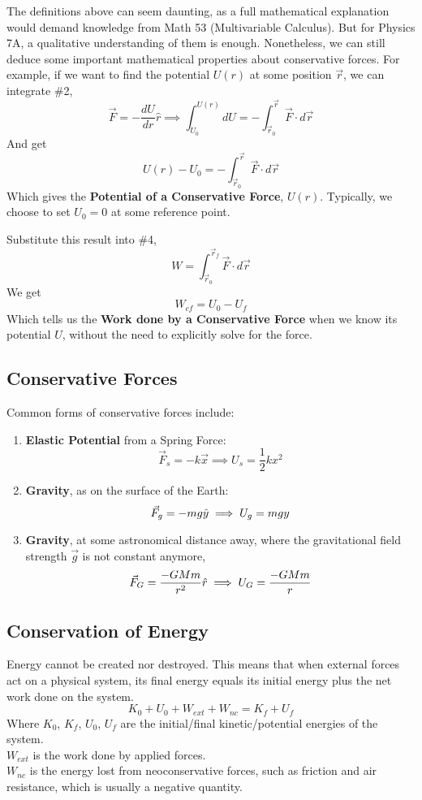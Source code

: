 \documentclass[11pt]{article}
\theoremstyle{gangnamstyle}{\newtheorem{definition}{Definition}[]}
\theoremstyle{gangnamstyle}{\newtheorem{example}{Example}[]}
\theoremstyle{gangnamstyle}{\newtheorem{problem}{Problem}[]}
\begin{document}
The definitions above can seem daunting, as a full mathematical explanation would demand knowledge from Math 53 (Multivariable Calculus). But for Physics 7A, a qualitative understanding of them is enough. Nonetheless, we can still deduce some important mathematical properties about conservative forces. For example, if we want to find the potential $U(r)$ at some position $\Vec{r}$, we can integrate \#2, 
\[ \Vec{F} = - \frac{dU}{dr} \hat{r} \implies \int_{U_0}^{U(r)} dU = - \int_{\Vec{r}_0}^{\Vec{r}} \Vec{F} \cdot d\Vec{r} \]
And get
\[ U(r) - U_0 = - \int_{\Vec{r}_0}^{\Vec{r}} \Vec{F} \cdot d\Vec{r} \]
Which gives the \textbf{Potential of a Conservative Force}, $U(r)$. Typically, we choose to set $U_0 = 0$ at some reference point. 

Substitute this result into \#4, 
\[ W = \int_{\Vec{r}_0}^{\Vec{r}_f} \Vec{F} \cdot d\Vec{r} \]
We get
\[ W_{cf} = U_0 - U_f \]
Which tells us the \textbf{Work done by a Conservative Force} when we know its potential $U$, without the need to explicitly solve for the force. 

\subsection{Conservative Forces}

Common forms of conservative forces include: 
\begin{enumerate}
\item \textbf{Elastic Potential} from a Spring Force: 
\[ \Vec{F}_s = -k \Vec{x} \implies U_s = \frac{1}{2}kx^2 \]
\item \textbf{Gravity}, as on the surface of the Earth: 
\[ \Vec{F}_g = -mg \Hat{y} \implies U_g = mgy \]
\item \textbf{Gravity}, at some astronomical distance away, where the gravitational field strength $\Vec{g}$ is not constant anymore, 
\[ \Vec{F}_G = \frac{-GMm}{r^2}\Hat{r} \implies U_G = \frac{-GMm}{r} \]
\end{enumerate}

\pagebreak

\subsection{Conservation of Energy}

Energy cannot be created nor destroyed. This means that when external forces act on a physical system, its final energy equals its initial energy plus the net work done on the system. 
\[ K_0 + U_0 + W_{ext} + W_{nc} = K_f + U_f \]
Where $K_0$, $K_f$, $U_0$, $U_f$ are the initial/final kinetic/potential energies of the system. \\
$W_{ext}$ is the work done by applied forces. \\
$W_{nc}$ is the energy lost from neoconservative forces, such as friction and air resistance, which is usually a negative quantity. 
\end{document}
